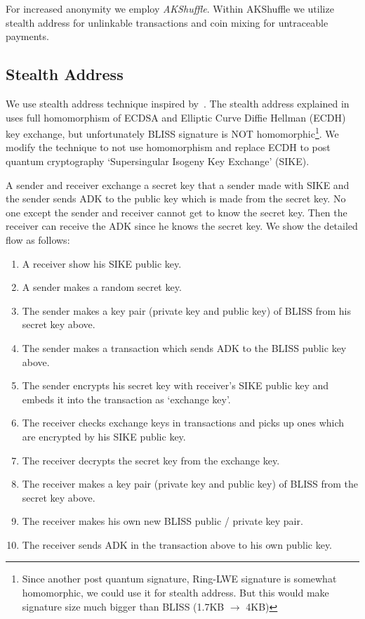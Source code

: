 \documentclass[a4paper,10pt,twocolumn]{article}
\begin{document}
	For increased anonymity we employ \emph{AKShuffle}. Within AKShuffle we utilize stealth address for unlinkable transactions
	and coin mixing for untraceable payments.


	\subsection{Stealth Address}

	We use stealth address technique inspired by~\cite{ringsig}. The stealth address
	explained in~\cite{ringsig} uses full homomorphism of ECDSA and  Elliptic Curve Diffie Hellman (ECDH) key exchange,
	but unfortunately	BLISS signature is NOT homomorphic\footnote{Since another post quantum signature, 
	Ring-LWE signature is somewhat homomorphic, we could use it for stealth address. But this
	would make signature size much bigger than BLISS (1.7KB \(\rightarrow\) 4KB)}.
	We modify the technique to not use
	homomorphism and replace ECDH  to post quantum cryptography `Supersingular Isogeny Key Exchange' (SIKE).

	A sender and receiver exchange a secret key that a sender made with SIKE and the sender sends ADK to the public key which is made from the secret key.
	No one except the sender and receiver cannot get to know the secret key.
	Then the receiver can receive the ADK since he knows the secret key. We show the detailed flow as follows:

	\begin{enumerate}
		\setlength\itemsep{0em}
		\item A receiver show his SIKE public key.
		\item A sender makes a random secret key.
		\item The sender makes a key pair (private key and public key) of BLISS from his secret key above.
		\item The sender makes a transaction which sends ADK to the BLISS public key above.
		\item The sender encrypts his secret key with receiver's SIKE public key and embeds it into the transaction as `exchange key'.
		\item The receiver checks exchange keys in transactions and picks up ones which are encrypted by his SIKE public key.
		\item The receiver decrypts the secret key from the exchange key.
		\item The receiver makes a key pair (private key and public key) of BLISS from the secret key above.
		\item The receiver makes his own new BLISS public / private key pair.
		\item The receiver sends ADK in the transaction above to his own public key.
	\end{enumerate}
\end{document}
